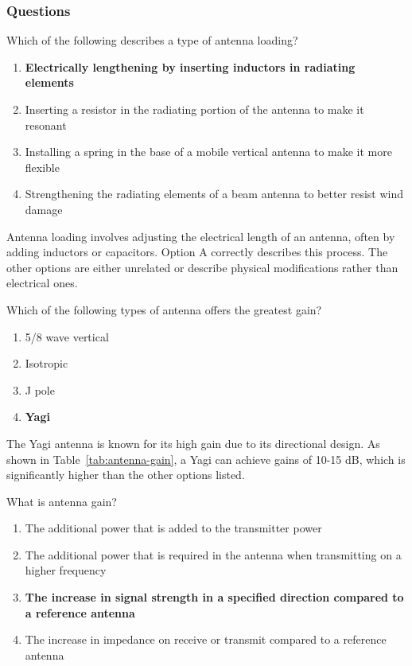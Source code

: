 \subsubsection{Questions}
\begin{tcolorbox}[colback=gray!10!white,colframe=black!75!black,title={T9A02}]
Which of the following describes a type of antenna loading?
\begin{enumerate}[label=\Alph*),noitemsep]
    \item \textbf{Electrically lengthening by inserting inductors in radiating elements}
    \item Inserting a resistor in the radiating portion of the antenna to make it resonant
    \item Installing a spring in the base of a mobile vertical antenna to make it more flexible
    \item Strengthening the radiating elements of a beam antenna to better resist wind damage
\end{enumerate}
\end{tcolorbox}

Antenna loading involves adjusting the electrical length of an antenna, often by adding inductors or capacitors. Option A correctly describes this process. The other options are either unrelated or describe physical modifications rather than electrical ones.

\begin{tcolorbox}[colback=gray!10!white,colframe=black!75!black,title={T9A06}]
Which of the following types of antenna offers the greatest gain?
\begin{enumerate}[label=\Alph*),noitemsep]
    \item 5/8 wave vertical
    \item Isotropic
    \item J pole
    \item \textbf{Yagi}
\end{enumerate}
\end{tcolorbox}

The Yagi antenna is known for its high gain due to its directional design. As shown in Table~\ref{tab:antenna-gain}, a Yagi can achieve gains of 10-15 dB, which is significantly higher than the other options listed.

\begin{tcolorbox}[colback=gray!10!white,colframe=black!75!black,title={T9A11}]
What is antenna gain?
\begin{enumerate}[label=\Alph*),noitemsep]
    \item The additional power that is added to the transmitter power
    \item The additional power that is required in the antenna when transmitting on a higher frequency
    \item \textbf{The increase in signal strength in a specified direction compared to a reference antenna}
    \item The increase in impedance on receive or transmit compared to a reference antenna
\end{enumerate}
\end{tcolorbox}

